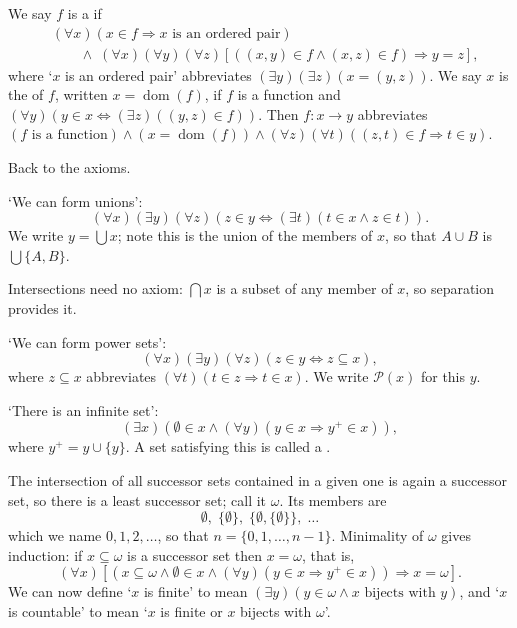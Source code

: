 \documentclass[a4paper]{scrartcl}
\newcommand{\dom}{\operatorname{dom}}
\begin{document}
\begin{definition}[Function]
  We say $f$ is a  if
  \begin{align*}
  &(\forall x)(x \in f \Rightarrow x \text{ is an ordered pair}) \\
  &\qquad \land \; (\forall x)(\forall y)(\forall z) [((x, y) \in f\land (x, z) \in f) \Rightarrow y = z],
  \end{align*}
  where `$x$ is an ordered pair' abbreviates $(\exists y)(\exists z)(x = (y,z))$. We say $x$ is the  of $f$, written $x = \dom(f)$, if $f$ is a function and $(\forall y)(y \in x \Leftrightarrow (\exists z)((y, z) \in f))$. Then $f: x \rightarrow y$ abbreviates $(f\text{ is a function}) \land (x = \dom(f)) \land (\forall z)(\forall t)((z, t) \in f \Rightarrow t \in y)$.
\end{definition}

Back to the axioms.

\begin{axiom}[Union]
  `We can form unions':
  $$
(\forall x)(\exists y)(\forall z)(z \in y \Leftrightarrow (\exists t)(t \in x \land z \in t)).
  $$
  We write $y = \bigcup x$; note this is the union of the members of $x$, so that $A \cup B$ is $\bigcup\{A, B\}$.
\end{axiom}

Intersections need no axiom: $\bigcap x$ is a subset of any member of $x$, so separation provides it.

\begin{axiom}
  `We can form power sets':
  $$
  (\forall x)(\exists y)(\forall z)(z \in y \Leftrightarrow z \subseteq x),
  $$
  where $z \subseteq x$ abbreviates $(\forall t)(t \in z \Rightarrow t \in x)$. We write $\mathcal{P}(x)$ for this $y$.
\end{axiom}

\begin{axiom}[Infinity]
`There is an infinite set':
$$
(\exists x)(\emptyset \in x \land (\forall y)(y \in x \Rightarrow y^+ \in x)),
$$
where $y^+ = y \cup \{y\}$. A set satisfying this is called a .
\end{axiom}

The intersection of all successor sets contained in a given one is again a successor set, so there is a least successor set; call it $\omega$. Its members are
$$\emptyset, \; \{\emptyset\}, \; \{\emptyset, \{\emptyset\}\}, \; \dots$$
which we name $0, 1, 2, \dots$, so that $n = \{0, 1, \dots, n-1\}$. Minimality of $\omega$ gives induction: if $x \subseteq \omega$ is a successor set then $x = \omega$, that is,
$$
(\forall x)[(x \subseteq \omega \land \emptyset \in x \land (\forall y)(y \in x \Rightarrow y^+ \in x)) \Rightarrow x = \omega].
$$
We can now define `$x$ is finite' to mean $(\exists y)(y \in \omega \land x \text{ bijects with } y)$, and `$x$ is countable' to mean `$x$ is finite or $x$ bijects with $\omega$'.
\end{document}
